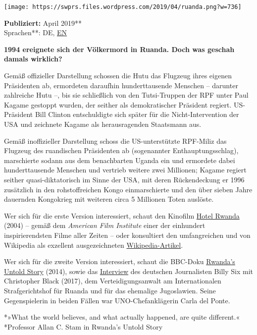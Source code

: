 \texttt{[image: https://swprs.files.wordpress.com/2019/04/ruanda.png?w=736]}

\textbf{Publiziert:} April 2019**\\
Sprachen**: DE,
\href{https://swprs.org/rwanda-what-did-really-happen-in-1994/}{EN}

\textbf{1994 ereignete sich der Völkermord in Ruanda. Doch was geschah
damals wirklich?}

Gemäß offizieller Darstellung schossen die Hutu das Flugzeug ihres
eigenen Präsidenten ab, ermordeten daraufhin hunderttausende Menschen --
darunter zahlreiche Hutu --, bis sie schließlich von den Tutsi-Truppen
der RPF unter Paul Kagame gestoppt wurden, der seither als
demokratischer Präsident regiert. US-Präsident Bill Clinton
entschuldigte sich später für die Nicht-Intervention der USA und
zeichnete Kagame als herausragenden Staatsmann aus.

Gemäß inoffizieller Darstellung schoss die US-unterstützte RPF-Miliz das
Flugzeug des ruandischen Präsidenten ab (sogenannter
Enthauptungsschlag), marschierte sodann aus dem benachbarten Uganda ein
und ermordete dabei hunderttausende Menschen und vertrieb weitere zwei
Millionen; Kagame regiert seither quasi-diktatorisch im Sinne der USA,
mit deren Rückendeckung er 1996 zusätzlich in den rohstoffreichen Kongo
einmarschierte und den über sieben Jahre dauernden Kongokrieg mit
weiteren circa 5 Millionen Toten auslöste.

Wer sich für die erste Version interessiert, schaut den Kinofilm
\href{https://www.youtube.com/watch?v=qZzfxL90100}{Hotel Rwanda} (2004)
-- gemäß dem \emph{American Film Institute} einer der einhundert
inspirierendsten Filme aller Zeiten -- oder konsultiert den
umfangreichen und von Wikipedia als exzellent ausgezeichneten
\href{https://de.wikipedia.org/wiki/V\%C3\%B6lkermord_in_Ruanda}{Wikipedia-Artikel}.

Wer sich für die zweite Version interessiert, schaut die BBC-Doku
\href{https://vimeo.com/107867605}{Rwanda's Untold Story} (2014), sowie
das \href{https://www.youtube.com/watch?v=ChBxPzyAJak}{Interview} des
deutschen Journalisten Billy Six mit Christopher Black (2017), dem
Verteidigungsanwalt am Internationalen Strafgerichtshof für Ruanda und
für das ehemalige Jugoslawien. Seine Gegenspielerin in beiden Fällen war
UNO-Chefanklägerin Carla del Ponte.

*»What the world believes, and what actually happened, are quite
different.«\\
*Professor Allan C. Stam in Rwanda's Untold Story

